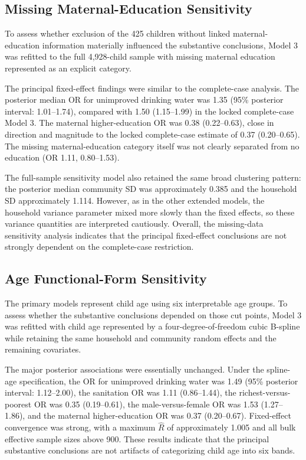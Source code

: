 \subsection{Missing Maternal-Education Sensitivity}

To assess whether exclusion of the 425 children without linked maternal-education information materially influenced the substantive conclusions, Model 3 was refitted to the full 4,928-child sample with missing maternal education represented as an explicit category.

The principal fixed-effect findings were similar to the complete-case analysis. The posterior median OR for unimproved drinking water was 1.35 (95\% posterior interval: 1.01--1.74), compared with 1.50 (1.15--1.99) in the locked complete-case Model 3. The maternal higher-education OR was 0.38 (0.22--0.63), close in direction and magnitude to the locked complete-case estimate of 0.37 (0.20--0.65). The missing maternal-education category itself was not clearly separated from no education (OR 1.11, 0.80--1.53).

The full-sample sensitivity model also retained the same broad clustering pattern: the posterior median community SD was approximately 0.385 and the household SD approximately 1.114. However, as in the other extended models, the household variance parameter mixed more slowly than the fixed effects, so these variance quantities are interpreted cautiously. Overall, the missing-data sensitivity analysis indicates that the principal fixed-effect conclusions are not strongly dependent on the complete-case restriction.


\subsection{Age Functional-Form Sensitivity}

The primary models represent child age using six interpretable age groups. To assess whether the substantive conclusions depended on those cut points, Model 3 was refitted with child age represented by a four-degree-of-freedom cubic B-spline while retaining the same household and community random effects and the remaining covariates.

The major posterior associations were essentially unchanged. Under the spline-age specification, the OR for unimproved drinking water was 1.49 (95\% posterior interval: 1.12--2.00), the sanitation OR was 1.11 (0.86--1.44), the richest-versus-poorest OR was 0.35 (0.19--0.61), the male-versus-female OR was 1.53 (1.27--1.86), and the maternal higher-education OR was 0.37 (0.20--0.67). Fixed-effect convergence was strong, with a maximum $\hat R$ of approximately 1.005 and all bulk effective sample sizes above 900. These results indicate that the principal substantive conclusions are not artifacts of categorizing child age into six bands.

